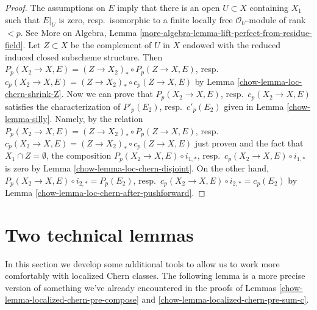 \begin{proof}

The assumptions on $E$ imply that there is an open $U \subset X$
containing $X_1$ such that $E|_U$ is zero, resp.\ isomorphic to a finite locally
free $\mathcal{O}_U$-module of rank $< p$. See More on Algebra, Lemma
\ref{more-algebra-lemma-lift-perfect-from-residue-field}.
Let $Z \subset X$ be the complement of $U$ in $X$ endowed with
the reduced induced closed subscheme structure. Then
$P_p(X_2 \to X, E) = (Z \to X_2)_* \circ P_p(Z \to X, E)$,
resp.\ $c_p(X_2 \to X, E) = (Z \to X_2)_* \circ c_p(Z \to X, E)$
by Lemma \ref{chow-lemma-loc-chern-shrink-Z}.
Now we can prove that $P_p(X_2 \to X, E)$, resp.\ $c_p(X_2 \to X, E)$
satisfies the characterization of $P'_p(E_2)$, resp.\ $c'_p(E_2)$
given in Lemma \ref{chow-lemma-silly}. Namely, by the relation
$P_p(X_2 \to X, E) = (Z \to X_2)_* \circ P_p(Z \to X, E)$,
resp.\ $c_p(X_2 \to X, E) = (Z \to X_2)_* \circ c_p(Z \to X, E)$
just proven and the fact that $X_1 \cap Z = \emptyset$,
the composition $P_p(X_2 \to X, E) \circ i_{1, *}$,
resp.\ $c_p(X_2 \to X, E) \circ i_{1, *}$ is zero
by Lemma \ref{chow-lemma-loc-chern-disjoint}.
On the other hand,
$P_p(X_2 \to X, E) \circ i_{2, *} = P_p(E_2)$,
resp.\ $c_p(X_2 \to X, E) \circ i_{2, *} = c_p(E_2)$
by Lemma \ref{chow-lemma-loc-chern-after-pushforward}.
\end{proof}

\section{Two technical lemmas}
\label{chow-section-tools-loc-chern}
In this section we develop some additional tools to allow us to work
more comfortably with localized Chern classes. The following lemma
is a more precise version of something we've already encountered in
the proofs of Lemmas \ref{chow-lemma-localized-chern-pre-compose} and
\ref{chow-lemma-localized-chern-pre-sum-c}.


